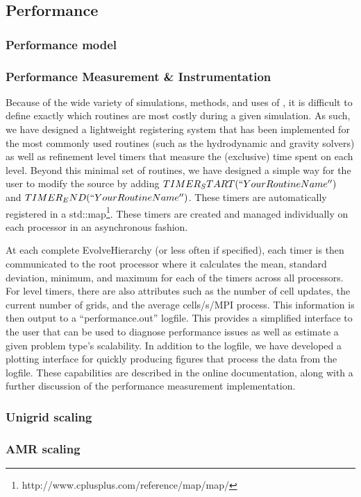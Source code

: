 
\subsection{Performance}
\label{sec.performance}

\subsubsection{Performance model }


\subsubsection{Performance Measurement \& Instrumentation }

Because of the wide variety of simulations, methods, and uses of , it
is difficult to define exactly which routines are most costly during a given
simulation.  As such, we have designed a lightweight registering system that
has been implemented for the most commonly used routines (such as the
hydrodynamic and gravity solvers) as well as refinement level timers that
measure the (exclusive) time spent on each level.  Beyond this minimal set of
routines, we have designed a simple way for the user to modify the source
by adding $TIMER_START(``Your Routine Name'')$ and $TIMER_END(``Your Routine
Name'')$.  These timers are automatically registered in a
std::map\footnote{http://www.cplusplus.com/reference/map/map/}.  These timers
are created and managed individually on each processor in an asynchronous
fashion.  

At each complete EvolveHierarchy (or less often if specified), each timer is
then communicated to the root processor where it calculates the mean, standard
deviation, minimum, and maximum for each of the timers across all processors. 
For level timers, there are also attributes such as the number of cell updates,
the current number of grids, and the average cells/s/MPI process.  This
information is then output to a ``performance.out'' logfile.  This provides a 
simplified interface to the user that can be used to diagnose performance 
issues as well as estimate a given problem type's scalability.  In addition to 
the logfile, we have developed a plotting interface for quickly producing 
figures that process the data from the logfile.  These capabilities are 
described in the online documentation, along with a further discussion of the 
performance measurement implementation.

\subsubsection{Unigrid scaling }


\subsubsection{AMR scaling }

